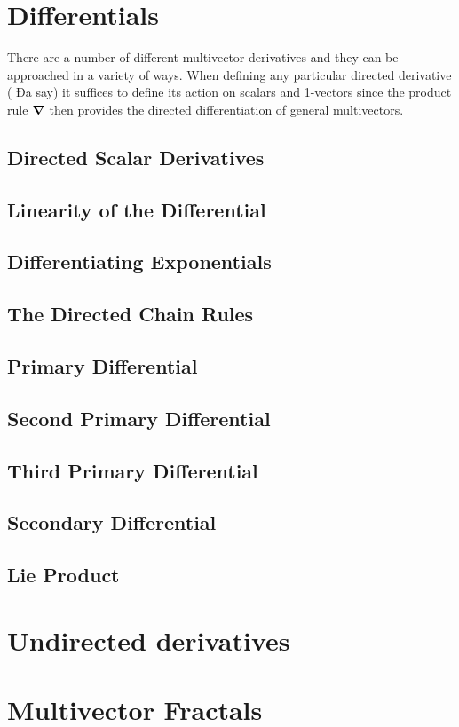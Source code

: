 \documentclass[a4paper]{book}
\numberwithin{equation}{chapter}
\begin{document}
\section{Differentials}
There are a number of different multivector derivatives and they can be approached in a 
variety of ways. When defining any particular directed derivative ( Ða say) it suffices to
define its action on scalars and 1-vectors since the product rule 
$\grad $ then provides the directed differentiation of general multivectors. 


\subsection{Directed Scalar Derivatives}
\subsection{Linearity of the Differential}
\subsection{Differentiating Exponentials}
\subsection{The Directed Chain Rules}
\subsection{Primary Differential}
\subsection{Second Primary Differential}
\subsection{Third Primary Differential}
\subsection{Secondary Differential}
\subsection{Lie Product}


\section{Undirected derivatives}
\section{Multivector Fractals}
\end{document}
